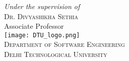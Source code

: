\begin{titlepage}
  { \textsl{Under the supervision of} } \\[\baselineskip]
  { \scshape Dr. Divyashikha Sethia } \\[1ex]
  { \small Associate Professor } \\[\baselineskip]

  \vfill
  \texttt{[image: DTU\_logo.png]} \\[\baselineskip]
  
  \vfill
  { \scshape Department of Software Engineering } \\[1ex]
  { \scshape Delhi Technological University } \\
\end{titlepage}
